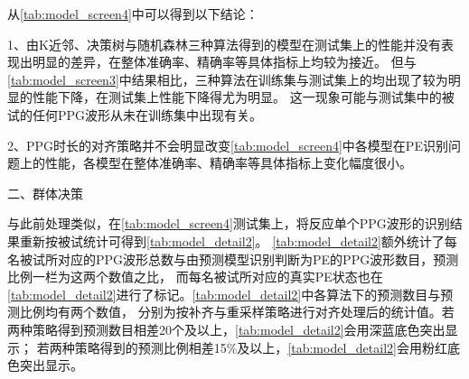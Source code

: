 从\autoref{tab:model_screen4}中可以得到以下结论：

1、由K近邻、决策树与随机森林三种算法得到的模型在测试集上的性能并没有表现出明显的差异，在整体准确率、精确率等具体指标上均较为接近。
但与\autoref{tab:model_screen3}中结果相比，三种算法在训练集与测试集上的均出现了较为明显的性能下降，在测试集上性能下降得尤为明显。
这一现象可能与测试集中的被试的任何PPG波形从未在训练集中出现有关。

2、PPG时长的对齐策略并不会明显改变\autoref{tab:model_screen4}中各模型在PE识别问题上的性能，各模型在整体准确率、精确率等具体指标上变化幅度很小。

二、群体决策

与此前处理类似，在\autoref{tab:model_screen4}测试集上，将反应单个PPG波形的识别结果重新按被试统计可得到\autoref{tab:model_detail2}。
\autoref{tab:model_detail2}额外统计了每名被试所对应的PPG波形总数与由预测模型识别判断为PE的PPG波形数目，预测比例一栏为这两个数值之比，
而每名被试所对应的真实PE状态也在\autoref{tab:model_detail2}进行了标记。\autoref{tab:model_detail2}中各算法下的预测数目与预测比例均有两个数值，
分别为按补齐与重采样策略进行对齐处理后的统计值。若两种策略得到预测数目相差20个及以上，\autoref{tab:model_detail2}会用深蓝底色突出显示；
若两种策略得到的预测比例相差15\%及以上，\autoref{tab:model_detail2}会用粉红底色突出显示。

